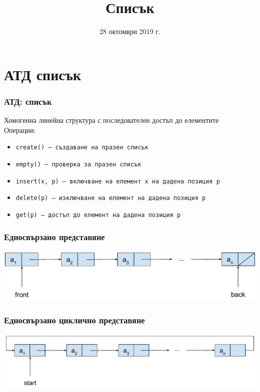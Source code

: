 \documentclass[alsotrans]{beamerswitch}
\title{Списък}
\date{28 октомври 2019 г.}
\begin{document}
\begin{frame}
  \titlepage
\end{frame}

\section{АТД списък}

\begin{frame}
  \frametitle{АТД: списък}

  Хомогенна линейна структура с последователен достъп до елементите\\[2ex]
  Операции:\\[1ex]
  \begin{itemize}
  \item \tt{create()} --- създаване на празен списък
  \item \tt{empty()} --- проверка за празен списък
  \item \tt{insert(x, p)} --- включване на елемент \tt x на дадена позиция \tt p
  \item \tt{delete(p)} --- изключване на елемент на дадена позиция \tt p
  \item \tt{get(p)} --- достъп до елемент на дадена позиция \tt p
  \end{itemize}
\end{frame}

\begin{frame}
  \frametitle{Едносвързано представяне}

  \begin{center}
    \includegraphics[width=\textwidth]{images/linked_list.pdf}
  \end{center}
\end{frame}

\begin{frame}
  \frametitle{Едносвързано циклично представяне}

  \begin{center}
    \includegraphics[width=\textwidth]{images/linked_cyclic_list.pdf}
  \end{center}
\end{frame}
\end{document}
